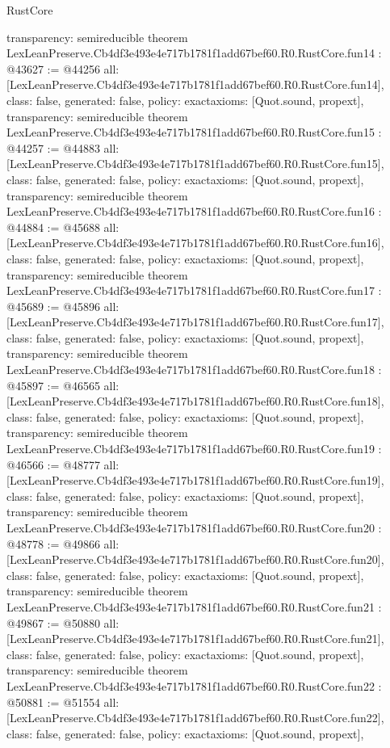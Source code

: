 \begin{lexlean}{RustCore}
\begin{coremodule}
{  transparency: semireducible
}
theorem LexLeanPreserve.Cb4df3e493e4e717b1781f1add67bef60.R0.RustCore.fun14 : @43627 := @44256 {
  all: [LexLeanPreserve.Cb4df3e493e4e717b1781f1add67bef60.R0.RustCore.fun14],
  class: false,
  generated: false,
  policy: exact{axioms: [Quot.sound, propext]},
  transparency: semireducible
}
theorem LexLeanPreserve.Cb4df3e493e4e717b1781f1add67bef60.R0.RustCore.fun15 : @44257 := @44883 {
  all: [LexLeanPreserve.Cb4df3e493e4e717b1781f1add67bef60.R0.RustCore.fun15],
  class: false,
  generated: false,
  policy: exact{axioms: [Quot.sound, propext]},
  transparency: semireducible
}
theorem LexLeanPreserve.Cb4df3e493e4e717b1781f1add67bef60.R0.RustCore.fun16 : @44884 := @45688 {
  all: [LexLeanPreserve.Cb4df3e493e4e717b1781f1add67bef60.R0.RustCore.fun16],
  class: false,
  generated: false,
  policy: exact{axioms: [Quot.sound, propext]},
  transparency: semireducible
}
theorem LexLeanPreserve.Cb4df3e493e4e717b1781f1add67bef60.R0.RustCore.fun17 : @45689 := @45896 {
  all: [LexLeanPreserve.Cb4df3e493e4e717b1781f1add67bef60.R0.RustCore.fun17],
  class: false,
  generated: false,
  policy: exact{axioms: [Quot.sound, propext]},
  transparency: semireducible
}
theorem LexLeanPreserve.Cb4df3e493e4e717b1781f1add67bef60.R0.RustCore.fun18 : @45897 := @46565 {
  all: [LexLeanPreserve.Cb4df3e493e4e717b1781f1add67bef60.R0.RustCore.fun18],
  class: false,
  generated: false,
  policy: exact{axioms: [Quot.sound, propext]},
  transparency: semireducible
}
theorem LexLeanPreserve.Cb4df3e493e4e717b1781f1add67bef60.R0.RustCore.fun19 : @46566 := @48777 {
  all: [LexLeanPreserve.Cb4df3e493e4e717b1781f1add67bef60.R0.RustCore.fun19],
  class: false,
  generated: false,
  policy: exact{axioms: [Quot.sound, propext]},
  transparency: semireducible
}
theorem LexLeanPreserve.Cb4df3e493e4e717b1781f1add67bef60.R0.RustCore.fun20 : @48778 := @49866 {
  all: [LexLeanPreserve.Cb4df3e493e4e717b1781f1add67bef60.R0.RustCore.fun20],
  class: false,
  generated: false,
  policy: exact{axioms: [Quot.sound, propext]},
  transparency: semireducible
}
theorem LexLeanPreserve.Cb4df3e493e4e717b1781f1add67bef60.R0.RustCore.fun21 : @49867 := @50880 {
  all: [LexLeanPreserve.Cb4df3e493e4e717b1781f1add67bef60.R0.RustCore.fun21],
  class: false,
  generated: false,
  policy: exact{axioms: [Quot.sound, propext]},
  transparency: semireducible
}
theorem LexLeanPreserve.Cb4df3e493e4e717b1781f1add67bef60.R0.RustCore.fun22 : @50881 := @51554 {
  all: [LexLeanPreserve.Cb4df3e493e4e717b1781f1add67bef60.R0.RustCore.fun22],
  class: false,
  generated: false,
  policy: exact{axioms: [Quot.sound, propext]},
}
\end{coremodule}
\end{lexlean}
